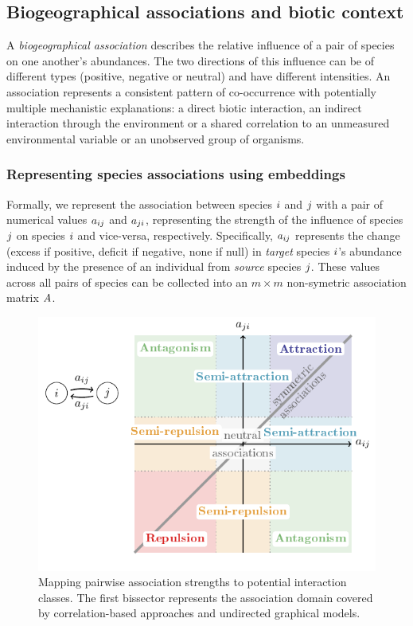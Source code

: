 \documentclass[10pt,a4paper]{article}
\begin{document}
\subsection{Biogeographical associations and biotic context}
A \textit{biogeographical association} describes the relative influence of a pair of species on one another's abundances.  The two directions of this influence can be of different types (positive, negative or neutral) and have different intensities.  An association represents a consistent pattern of co-occurrence with potentially multiple mechanistic explanations: a direct biotic interaction, an indirect interaction through the environment or a shared correlation to an unmeasured environmental variable or an unobserved group of organisms.

\subsubsection{Representing species associations using embeddings}
Formally, we represent the association between species $i$ and
$j$ with a pair of numerical values $a_{ij}$ and
$a_{ji}$, representing the strength of the influence of species
$j$ on species $i$ and vice-versa, respectively. Specifically,
$a_{ij}$ represents the change (excess if
positive, deficit if negative, none if null) in \textit{target}
species $i$'s abundance induced by the presence of an individual
from \textit{source} species $j$.  These values across all pairs of
species can be collected into an $m \times m$ non-symetric association
matrix $A$. \\

\begin{figure}[bthp]
	\centering
	\includegraphics[page=1]{tikz_figures.pdf}
	\caption{Mapping pairwise association strengths to potential interaction classes. The first bissector represents the association domain covered by correlation-based approaches and undirected graphical models.}
	\label{assocdomain}
\end{figure}
\end{document}
